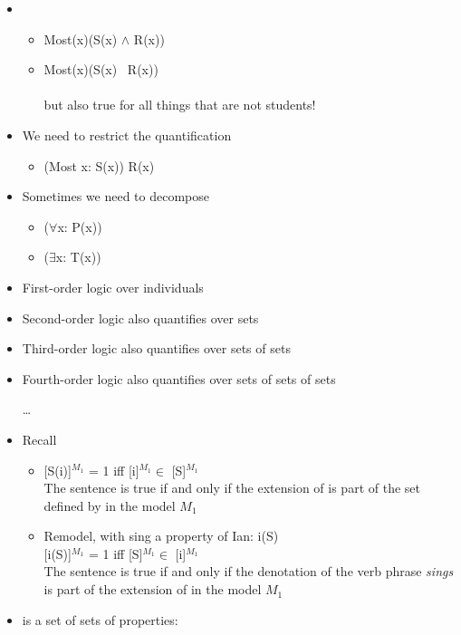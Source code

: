 \documentclass[headrule,footrule]{foils}
\begin{document}

\begin{itemize}
\item {}
  \begin{itemize}
  \item Most(x)(S(x) $\wedge$ R(x))
    \\ 
  \item Most(x)(S(x) \into\  R(x))
    \\ 
    \\ but also true for all things that are not students!
  \end{itemize}
\item We need to restrict the quantification
  \begin{itemize}
  \item (Most x: S(x)) R(x)
  \end{itemize}
\item Sometimes we need to decompose
  \begin{itemize}
  \item {} ($\forall$x: P(x))
  \item {} ($\exists$x: T(x))
  \end{itemize}
\end{itemize}

\begin{itemize}
\item First-order logic over individuals
\item Second-order logic also quantifies over sets
\item Third-order logic also quantifies over sets of sets
\item Fourth-order logic also quantifies over sets of sets of sets
\item[\ldots{}]
\end{itemize}



 \begin{itemize}
\item Recall  
  \begin{itemize}
  \item {[S(i)]$^{M_1}$ = 1 iff [i]$^{M_1} \in$ [S]$^{M_1}$} \\ The
    sentence is true if and only if the extension of  is part of
    the set defined by  in the model $M_1$
  \item Remodel, with sing a property of Ian: i(S) \\ {[i(S)]$^{M_1}$
      = 1 iff [S]$^{M_1} \in$ [i]$^{M_1}$} \\ The sentence is true if
    and only if the denotation of the verb phrase \textit{sings} is
    part of the extension of   in the model $M_1$
  \end{itemize}
\item {} is a set of sets of properties: 
\end{itemize}
\end{document}
